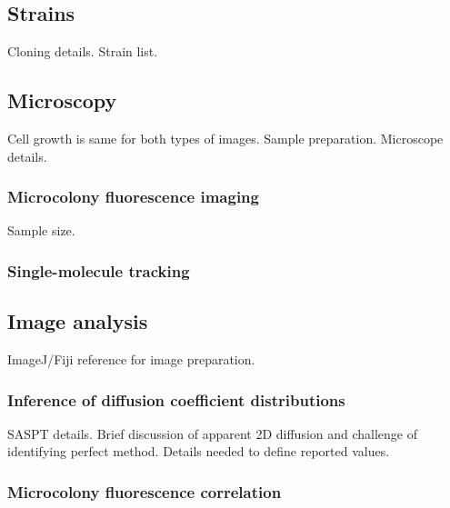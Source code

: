 \documentclass[pdflatex,sn-basic]{sn-jnl}%
\begin{document}
\loremipsum{}

\subsection{Strains}

Cloning details.
Strain list.

\loremipsum{} 

\subsection{Microscopy}

Cell growth is same for both types of images.
Sample preparation.
Microscope details.

\loremipsum{}

\subsubsection{Microcolony fluorescence imaging}

Sample size.

\loremipsum{} 

\subsubsection{Single-molecule tracking}

\loremipsum{} 

\subsection{Image analysis}

ImageJ/Fiji reference for image preparation.

\loremipsum{}

\subsubsection{Inference of diffusion coefficient distributions}

SASPT details.
Brief discussion of apparent 2D diffusion and challenge of identifying perfect method.
Details needed to define reported values.

\loremipsum{} 

\subsubsection{Microcolony fluorescence correlation}
\end{document}
